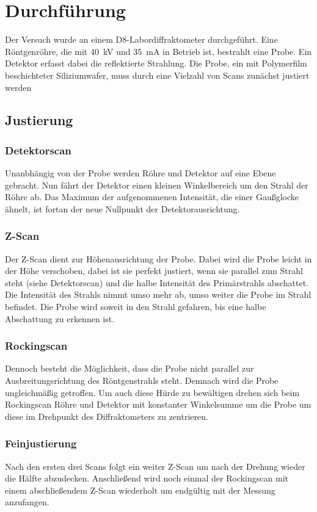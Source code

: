 \section{Durchführung}
\label{sec:Durchführung}
Der Versuch wurde an einem D8-Labordiffraktometer durchgeführt.
Eine Röntgenröhre, die mit \qty{40}{\kilo\volt} und \qty{35}{\milli\ampere} in Betrieb ist,
bestrahlt eine Probe. Ein Detektor erfasst dabei die reflektierte Strahlung.
Die Probe, ein mit Polymerfilm beschichteter Siliziumwafer, muss durch eine Vielzahl von Scans zunächst justiert werden

\subsection{Justierung}
\subsubsection*{Detektorscan}
Unanbhängig von der Probe werden Röhre und Detektor auf eine Ebene gebracht. Nun fährt der Detektor einen kleinen Winkelbereich um den Strahl der Röhre ab.
Das Maximum der aufgenommenen Intensität, die einer Gaußglocke ähnelt, ist fortan der neue Nullpunkt der Detektorausrichtung.

\subsubsection*{Z-Scan}
Der Z-Scan dient zur Höhenausrichtung der Probe.
Dabei wird die Probe leicht in der Höhe verschoben,
dabei ist sie perfekt justiert,
wenn sie parallel zum Strahl steht (siehe Detektorscan) und die halbe Intensität des Primärstrahls abschattet.
Die Intensität des Strahls nimmt umso mehr ab, umso weiter die Probe im Strahl befindet.
Die Probe wird soweit in den Strahl gefahren, bis eine halbe Abschattung zu erkennen ist. 

\subsubsection*{Rockingscan}
Dennoch besteht die Möglichkeit, dass die Probe nicht parallel zur Ausbreitungsrichtung des Röntgenstrahls steht.
Demnach wird die Probe ungleichmäßig getroffen. Um auch diese Hürde zu bewältigen drehen sich beim Rockingscan
Röhre und Detektor mit konstanter Winkelsumme um die Probe um diese im Drehpunkt des Diffraktometers zu zentrieren.

\subsubsection*{Feinjustierung}
Nach den ersten drei Scans folgt ein weiter Z-Scan um nach der Drehung wieder die Hälfte abzudecken.
Anschließend wird noch einmal der Rockingscan mit einem abschließendem Z-Scan wiederholt um endgültig mit der Messung anzufangen.

